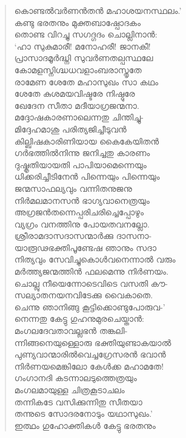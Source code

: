 \begin{verse}
കൊണ്ടല്‍വര്‍ണന്‍തന്‍ മഹാശയനസ്ഥലം.’\\
കണ്ടു ഭരതനും മുക്തബാഷ്പോദകം\\
തൊണ്ട വിറച്ചു സഗദ്ഗദം ചൊല്ലിനാന്‍:\\
‘ഹാ സുകുമാരീ! മനോഹരീ! ജാനകീ!\\
പ്രാസാദമൂര്‍ദ്ധ്നി സുവര്‍ണതല്പസ്ഥലേ\\
കോമളസ്നിഗ്ദ്ധധവളാംബരാസ്തൃതേ\\
രാമേണ ശേതേ മഹാസുഖം സാ കഥം\\
ശേതേ കുശമയവിഷ്ടരേ നിഷ്ഠുരേ\\
ഖേദേന സീതാ മദീയാഗ്രജന്മനാ.\\
മദ്ദോഷകാരണാലെന്നതു ചിന്തിച്ചു-\\
മിദ്ദേഹമാശു പരിത്യജിച്ചീടുവന്‍\\
കില്ബിഷകാരിണിയായ കൈകേയിതന്‍\\
ഗര്‍ഭത്തില്‍നിന്നു ജനിച്ചതു കാരണം\\
ദുഷ്കൃതിയായതി പാപിയാമെന്നെയും\\
ധിക്കരിച്ചീടിനേന്‍ പിന്നെയും പിന്നെയും\\
ജന്മസാഫല്യവും വന്നിതനുജനു\\
നിര്‍മലമാനസന്‍ ഭാഗ്യവാനെത്രയും\\
അഗ്രജന്‍തന്നെപ്പരിചരിച്ചെപ്പോഴും\\
വ്യഗ്രം വനത്തിനു പോയതവനല്ലോ.\\
ശ്രീരാമദാസദാസന്മാര്‍ക്കു ദാസനാ-\\
യാരൂഢഭക്തിപൂണ്ടേഷ ഞാനും സദാ\\
നിത്യവും സേവിച്ചുകൊള്‍വനെന്നാല്‍ വരും\\
മര്‍ത്ത്യജന്മത്തിന്‍ ഫലമെന്നു നിര്‍ണയം.\\
ചൊല്ലു നീയെന്നോടെവിടെ വസതി കൗ-\\
സല്യാതനയനവിടേക്കു വൈകാതെ.\\
ചെന്നു ഞാനിങ്ങു കൂട്ടിക്കൊണ്ടുപോരുവ-’\\
നെന്നതു കേട്ടു ഗുഹനുമുരചെയ്താന്‍:\\
മംഗലദേവതാവല്ലഭന്‍ തങ്കലി-\\
ന്നിങ്ങനെയുള്ളൊരു ഭക്തിയുണ്ടാകയാല്‍\\
പുണ്യവാന്മാരില്‍വെച്ചഗ്രേസരന്‍ ഭവാന്‍\\
നിര്‍ണയമെങ്കിലോ കേള്‍ക്ക മഹാമതേ!\\
ഗംഗാനദി കടന്നാലടുത്തെത്രയും\\
മംഗലമായുള്ള ചിത്രകൂടാചലം\\
തന്നികടേ വസിക്കുന്നിതു സീതയാ\\
തന്നുടെ സോദരനോടും യഥാസുഖം.’\\
ഇത്ഥം ഗുഹോക്തികള്‍ കേട്ടു ഭരതനും\\

\end{verse}
